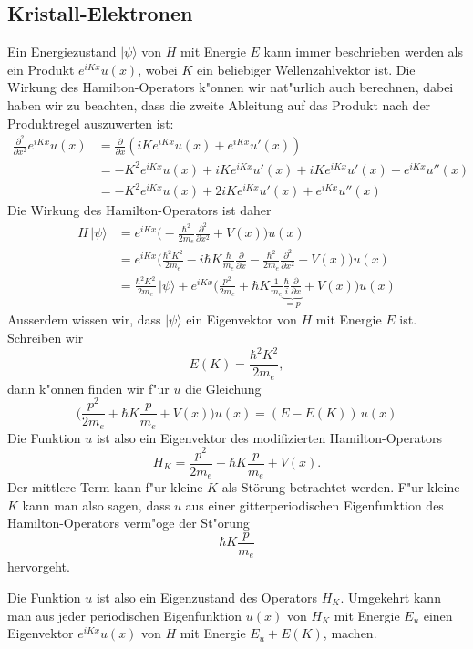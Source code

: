\subsection{Kristall-Elektronen}
Ein Energiezustand $|\psi\rangle$ von $H$ mit Energie $E$
kann immer beschrieben werden als ein Produkt $e^{iKx} u(x)$,
wobei $K$ ein beliebiger Wellenzahlvektor ist.
Die Wirkung des Hamilton-Operators k"onnen wir nat"urlich auch
berechnen, dabei haben wir zu beachten, dass die zweite Ableitung
auf das Produkt nach der Produktregel auszuwerten ist:
\begin{align*}
\frac{\partial^2}{\partial x^2}e^{iKx}u(x)
&=
\frac{\partial}{\partial x}
\left(
iKe^{iKx}u(x) + e^{iKx}u'(x)
\right)
\\
&=
-K^2e^{iKx}u(x) + iKe^{iKx}u'(x)+iKe^{iKx}u'(x)+e^{iKx}u''(x)
\\
&=
-K^2e^{iKx}u(x) + 2iKe^{iKx}u'(x)+e^{iKx}u''(x)
\end{align*}
Die Wirkung des Hamilton-Operators ist daher
\begin{align*}
H\,|\psi\rangle
&=
e^{iKx}\biggl(
-\frac{\hbar^2}{2m_e}\frac{\partial^2}{\partial x^2} + V(x)
\biggr)u(x)
\\
&=e^{iKx}\biggl(
\frac{\hbar^2K^2}{2m_e}
-i\hbar K\frac{\hbar}{m_e}\frac{\partial}{\partial x}
-\frac{\hbar^2}{2m_e}\frac{\partial^2}{\partial x^2}
+V(x)
\biggr)u(x)
\\
&=\frac{\hbar^2K^2}{2m_e}\,|\psi\rangle
+e^{iKx}\biggl(\frac{p^2}{2m_e}
+\hbar K\frac{1}{m_e}\underbrace{\frac{\hbar}{i}\frac{\partial}{\partial x}}_{=p}
+V(x)\biggr)u(x)
\end{align*}
Ausserdem wissen wir, dass $|\psi\rangle$ ein Eigenvektor von $H$ mit 
Energie $E$ ist.
Schreiben wir
\[
E(K)=\frac{\hbar^2K^2}{2m_e},
\]
dann k"onnen finden wir f"ur $u$ die Gleichung
\begin{equation}
\biggl(\frac{p^2}{2m_e}+\hbar K\frac{p}{m_e}+V(x)\biggr) u(x) = (E-E(K))\,u(x)
\label{skript:uewgleichung}
\end{equation}
Die Funktion $u$ ist also ein Eigenvektor des modifizierten Hamilton-Operators
\[
H_K= \frac{p^2}{2m_e}+\hbar K\frac{p}{m_e}+V(x).
\]
Der mittlere Term kann f"ur kleine $K$ als Störung betrachtet werden.
F"ur kleine $K$ kann man also sagen, dass $u$ aus einer gitterperiodischen
Eigenfunktion des Hamilton-Operators verm"oge der St"orung
\[
\hbar K\frac{p}{m_e}
\]
hervorgeht.

Die Funktion $u$ ist also ein Eigenzustand des Operators $H_K$. Umgekehrt
kann man aus jeder periodischen Eigenfunktion $u(x)$ von $H_K$ mit Energie
$E_u$ einen Eigenvektor $e^{iKx}u(x)$ von $H$ mit Energie $E_u+E(K)$, machen.

